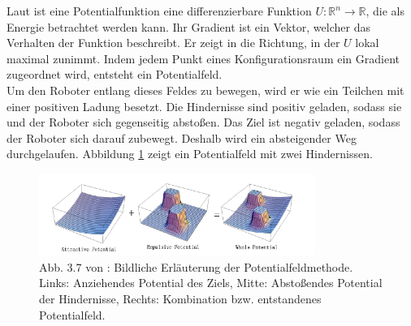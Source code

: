 Laut \cite{Principles:05} ist eine Potentialfunktion eine differenzierbare Funktion $U : \mathbb{R}^{n} \rightarrow \mathbb{R}$, die als Energie betrachtet werden kann. Ihr Gradient ist ein Vektor, welcher das Verhalten der Funktion beschreibt. Er zeigt in die Richtung, in der $U$ lokal maximal zunimmt. Indem jedem Punkt eines Konfigurationsraum ein Gradient zugeordnet wird, entsteht ein Potentialfeld.\\
Um den Roboter entlang dieses Feldes zu bewegen, wird er wie ein Teilchen mit einer positiven Ladung besetzt. Die Hindernisse sind positiv geladen, sodass sie und der Roboter sich gegenseitig abstoßen. Das Ziel ist negativ geladen, sodass der Roboter sich darauf zubewegt. Deshalb wird ein absteigender Weg durchgelaufen. Abbildung \ref*{potentialfield01} zeigt ein Potentialfeld mit zwei Hindernissen.
\begin{figure}[H] %
	\centering
	\includegraphics[width=0.8\textwidth]{images/Potential_Field.png}
	\caption{Abb. 3.7 von \cite{Petersen:15}: Bildliche Erläuterung der Potentialfeldmethode. Links: Anziehendes Potential des Ziels, Mitte: Abstoßendes Potential der Hindernisse, Rechts: Kombination bzw. entstandenes Potentialfeld.}
	\label{potentialfield01}
\end{figure}


